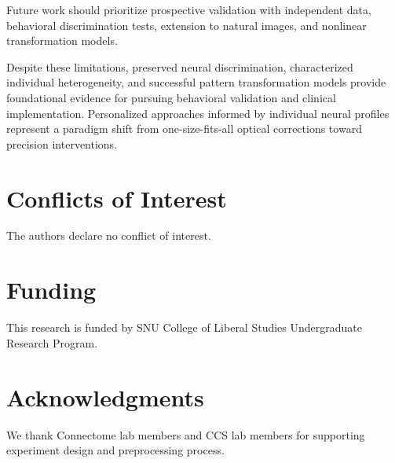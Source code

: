 \documentclass[12pt,a4paper]{article}
\begin{document}
Future work should prioritize prospective validation with independent data, behavioral discrimination tests, extension to natural images, and nonlinear transformation models.

Despite these limitations, preserved neural discrimination, characterized individual heterogeneity, and successful pattern transformation models provide foundational evidence for pursuing behavioral validation and clinical implementation. Personalized approaches informed by individual neural profiles represent a paradigm shift from one-size-fits-all optical corrections toward precision interventions.


\section*{Conflicts of Interest}
The authors declare no conflict of interest.

\section*{Funding}
This research is funded by SNU College of Liberal Studies Undergraduate Research Program.

\section*{Acknowledgments}
We thank Connectome lab members and CCS lab members for supporting experiment design and preprocessing process.


\printbibliography
\end{document}
